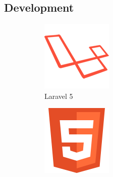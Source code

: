 \subsection{Development}
\begin{figure}[H]
    \centering
    \begin{subfigure}[t]{0.2\linewidth}
        \centering
        \includegraphics[width=\linewidth]{Images/Generic/Icons/Laravel}
        \caption{Laravel 5}\label{fig:Laravel}        
    \end{subfigure}
    \quad
    \begin{subfigure}[t]{0.2\linewidth}
        \centering
        \includegraphics[width=\linewidth]{Images/Generic/Icons/HTML_5}

\end{subfigure}
\end{figure}
